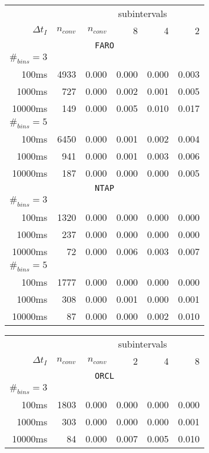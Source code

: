 \begin{sidewaystable}
\centering
{}
\begin{tabular}{@{}rrrrrr@{}}
\toprule
 &  & \multicolumn{4}{c}{subintervals} \\ 
\cmidrule{3-6}
$\Delta t_I$ & $n_{conv}$ & $n_{conv}$ & 8 & 4 & 2 \\
\midrule
\multicolumn{6}{c}{\texttt{FARO}} \\
$\#_{bins}=3$ &&&&& \\
100ms &  4933 & 0.000 & 0.000 & 0.000 & 0.003 \\
1000ms &  727 & 0.000 & 0.002 & 0.001 & 0.005 \\
10000ms & 149 & 0.000 & 0.005 & 0.010 & 0.017 \\
$\#_{bins}=5$ &&&&& \\
100ms &  6450 & 0.000 & 0.001 & 0.002 & 0.004 \\
1000ms &  941 & 0.000 & 0.001 & 0.003 & 0.006 \\
10000ms & 187 & 0.000 & 0.000 & 0.000 & 0.005 \\
\multicolumn{6}{c}{\texttt{NTAP}} \\
$\#_{bins}=3$ &&&&& \\
100ms & 1320 & 0.000 & 0.000 & 0.000 & 0.000 \\
1000ms & 237 & 0.000 & 0.000 & 0.000 & 0.000 \\
10000ms & 72 & 0.000 & 0.006 & 0.003 & 0.007 \\
$\#_{bins}=5$ &&&&& \\
100ms & 1777 & 0.000 & 0.000 & 0.000 & 0.000 \\
1000ms & 308 & 0.000 & 0.001 & 0.000 & 0.001 \\
10000ms & 87 & 0.000 & 0.000 & 0.002 & 0.010 \\
\bottomrule
\end{tabular} \hspace{20mm}
\begin{tabular}{@{}rrrrrr@{}}
\toprule
 &  & \multicolumn{4}{c}{subintervals} \\ 
\cmidrule{3-6}
$\Delta t_I$ & $n_{conv}$ & $n_{conv}$ & 2 & 4 & 8 \\
\midrule
\multicolumn{6}{c}{\texttt{ORCL}} \\
$\#_{bins}=3$ &&&&& \\
100ms & 1803 & 0.000 & 0.000 & 0.000 & 0.000 \\
1000ms & 303 & 0.000 & 0.000 & 0.000 & 0.001 \\
10000ms & 84 & 0.000 & 0.007 & 0.005 & 0.010 \\

\end{tabular}
\end{sidewaystable}
